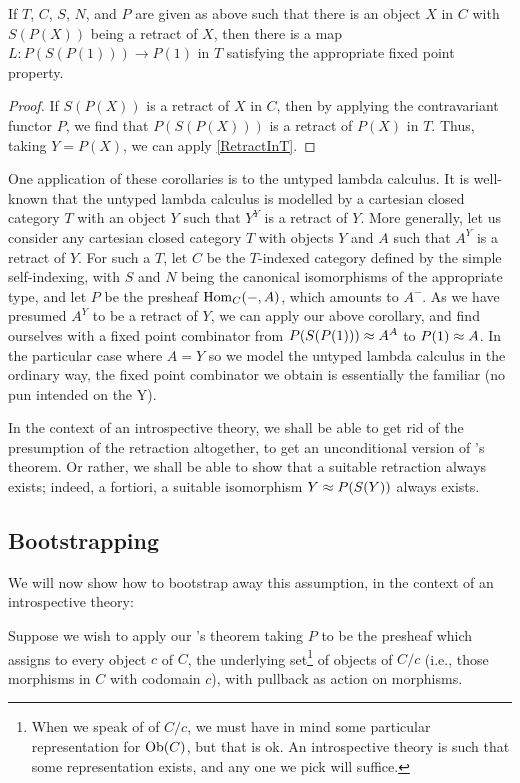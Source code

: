 \begin{corollary}\label{RetractInC}
If $T$, $C$, $S$, $N$, and $P$ are given as above such that there is an object $X$ in $C$ with $S(P(X))$ being a retract of $X$, then there is a map $L : P(S(P(1))) \to P(1)$ in $T$ satisfying the appropriate fixed point property.
\end{corollary}
\begin{proof}
If $S(P(X))$ is a retract of $X$ in $C$, then by applying the contravariant functor $P$, we find that $P(S(P(X)))$ is a retract of $P(X)$ in $T$. Thus, taking $Y = P(X)$, we can apply \cref{RetractInT}.
\end{proof}

One application of these corollaries is to the untyped lambda calculus. It is well-known that the untyped lambda calculus is modelled by a cartesian closed category $T$ with an object $Y$ such that $Y^Y$ is a retract of $Y$. More generally, let us consider any cartesian closed category $T$ with objects $Y$ and $A$ such that $A^Y$ is a retract of $Y$. For such a $T$, let $C$ be the $T$-indexed category defined by the simple self-indexing, with $S$ and $N$ being the canonical isomorphisms of the appropriate type, and let $P$ be the presheaf $\operatorname{Hom}_C(-, A)$, which amounts to $A^{-}$. As we have presumed $A^Y$ to be a retract of $Y$, we can apply our above corollary, and find ourselves with a fixed point combinator from $P(S(P(1))) \approx A^A$ to $P(1) \approx A$. In the particular case where $A = Y$ so we model the untyped lambda calculus in the ordinary way, the fixed point combinator we obtain is essentially the familiar  (no pun intended on the Y).

In the context of an introspective theory, we shall be able to get rid of the presumption of the retraction altogether, to get an unconditional version of \Loeb's theorem. Or rather, we shall be able to show that a suitable retraction always exists; indeed, a fortiori, a suitable isomorphism $Y \approx P(S(Y))$ always exists.

\subsection{Bootstrapping}
We will now show how to bootstrap away this assumption, in the context of an introspective theory:

Suppose we wish to apply our \Loeb's theorem taking $P$ to be the presheaf which assigns to every object $c$ of $C$, the underlying set\footnote{When we speak of  of $C/c$, we must have in mind some particular representation for $\operatorname{Ob}(C)$, but that is ok. An introspective theory is such that some representation exists, and any one we pick will suffice.} of objects of $C/c$ (i.e., those morphisms in $C$ with codomain $c$), with pullback as action on morphisms.


